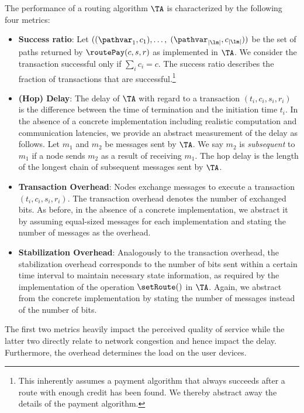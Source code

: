 The performance of a routing algorithm $\TA$ is characterized by the following four metrics:
\begin{itemize}
\item \textbf{Success ratio}: 
Let $((\pathvar_1, c_1), \ldots,$ $(\pathvar_{|\lm|}, c_{|\lm|}))$ be the set of paths 
returned by $\routePay(c, s, r)$ as implemented in $\TA$. We consider the transaction successful 
only if $\sum_i c_i = c$.  The success ratio describes the fraction of transactions  
that are successful.\footnote{This inherently assumes a payment algorithm that always succeeds 
after a route with enough credit has been found. We thereby abstract away the details of the 
payment algorithm.} 
 
\item \textbf{(Hop) Delay}: The delay of $\TA$ with regard to a transaction $(t_i,c_i,s_i,r_i)$ is the difference between the time of termination and the initiation time $t_i$. In the absence of a concrete implementation including realistic computation and communication latencies, we provide an abstract measurement of the delay as follows. Let $m_1$ and $m_2$ be messages sent by $\TA$. We say $m_2$ is \emph{subsequent} to $m_1$ if a node sends $m_2$ as a result of receiving $m_1$. The hop delay is the length of the longest chain of subsequent messages sent by $\TA$.
\item \textbf{Transaction Overhead}: Nodes exchange messages to execute a transaction $(t_i,c_i,s_i,r_i)$. The transaction overhead denotes the number of exchanged bits. 
As before, in the absence of a concrete implementation, we abstract it by assuming equal-sized messages for each implementation and stating the number of messages as the overhead. 
\item \textbf{Stabilization Overhead}: Analogously to the transaction overhead, the stabilization overhead corresponds to the number of bits sent within a certain time interval to maintain necessary state information, 
as required by the implementation of the operation $\setRoute()$ in $\TA$. Again, we abstract from the concrete implementation by stating the number of messages instead of the number of bits. 
\end{itemize}
The first two metrics heavily impact the perceived quality of service while the latter two directly relate to network congestion and hence impact the delay. Furthermore, the overhead determines the load on the user devices.  

 

 

